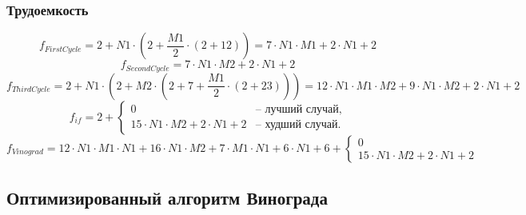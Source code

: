     \subsubsection*{Трудоемкость}
    \begin{equation}
    f_{FirstCycle} = 2 + N1 \cdot (2+ \frac{M1}{2} \cdot (2 + 12)) = 7 \cdot N1 \cdot M1 + 2\cdot N1 + 2
    \end{equation}
    \begin{equation}
    f_{SecondCycle} = 7 \cdot N1 \cdot M2 + 2 \cdot N1 + 2
    \end{equation}
    \begin{equation}
    f_{ThirdCycle} = 2 + N1 \cdot (2+ M2 \cdot (2 + 7 + \frac{M1} {2} \cdot (2 + 23))) = 12 \cdot N1 \cdot M1 \cdot M2 + 9 \cdot N1 \cdot M2 + 2 \cdot N1 + 2
    \end{equation}
    \begin{equation}
    f_{if}= 2 + \begin{cases}
            0 &\text{-- лучший случай},\\
            15 \cdot N1 \cdot M2 + 2 \cdot N1 + 2 &\text{-- худший случай}.  
    \end{cases}
    \end{equation}
    \begin{equation}
    f_{Vinograd} = 12 \cdot N1 \cdot M1 \cdot N1 + 16\cdot N1 \cdot M2 + 7 \cdot M1 \cdot N1  + 6\cdot N1 + 6 + 
    \begin{cases}
            0 \\
            15 \cdot N1 \cdot M2 + 2 \cdot N1 + 2  
    \end{cases}
    \end{equation}

    \subsection{Оптимизированный алгоритм Винограда}

